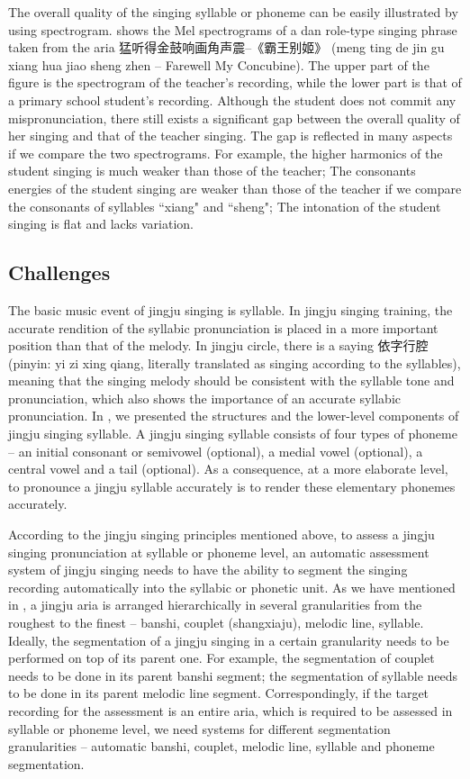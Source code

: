 The overall quality of the singing syllable or phoneme can be easily illustrated by using spectrogram.  shows the Mel spectrograms of a dan role-type singing phrase taken from the aria 猛听得金鼓响画角声震--《霸王别姬》 (meng ting de jin gu xiang hua jiao sheng zhen -- Farewell My Concubine). The upper part of the figure is the spectrogram of the teacher's recording, while the lower part is that of a primary school student's recording. Although the student does not commit any mispronunciation, there still exists a significant gap between the overall quality of her singing and that of the teacher singing. The gap is reflected in many aspects if we compare the two spectrograms. For example, the higher harmonics of the student singing is much weaker than those of the teacher; The consonants energies of the student singing are weaker than those of the teacher if we compare the consonants of syllables ``xiang" and ``sheng"; The intonation of the student singing is flat and lacks variation. 

\subsection{Challenges}\label{sec:ch3:challenges}

The basic music event of jingju singing is syllable. In jingju singing training, the accurate rendition of the syllabic pronunciation is placed in a more important position than that of the melody. In jingju circle, there is a saying 依字行腔 (pinyin: yi zi xing qiang, literally translated as singing according to the syllables), meaning that the singing melody should be consistent with the syllable tone and pronunciation, which also shows the importance of an accurate syllabic pronunciation. In , we presented the structures and the lower-level components of jingju singing syllable. A jingju singing syllable consists of four types of phoneme -- an initial consonant or semivowel (optional), a medial vowel (optional), a central vowel and a tail (optional). As a consequence, at a more elaborate level, to pronounce a jingju syllable accurately is to render these elementary phonemes accurately.

According to the jingju singing principles mentioned above, to assess a jingju singing pronunciation at syllable or phoneme level, an automatic assessment system of jingju singing needs to have the ability to segment the singing recording automatically into the syllabic or phonetic unit. As we have mentioned in , a jingju aria is arranged hierarchically in several granularities from the roughest to the finest -- banshi, couplet (shangxiaju), melodic line, syllable. Ideally, the segmentation of a jingju singing in a certain granularity needs to be performed on top of its parent one. For example, the segmentation of couplet needs to be done in its parent banshi segment; the segmentation of syllable needs to be done in its parent melodic line segment. Correspondingly, if the target recording for the assessment is an entire aria, which is required to be assessed in syllable or phoneme level, we need systems for different segmentation granularities -- automatic banshi, couplet, melodic line, syllable and phoneme segmentation. 

